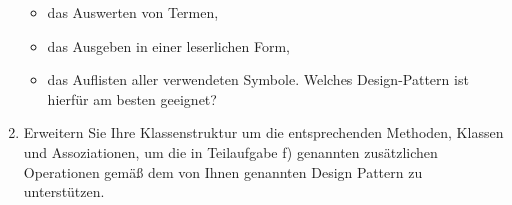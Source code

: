 \documentclass{lehramt-informatik-aufgabe}
\begin{document}
\begin{enumerate}
\begin{itemize}
\item das Auswerten von Termen,
\item das Ausgeben in einer leserlichen Form,
\item das Auflisten aller verwendeten Symbole.
Welches Design-Pattern ist hierfür am besten geeignet?

\end{itemize}

\item Erweitern Sie Ihre Klassenstruktur um die entsprechenden Methoden,
Klassen und Assoziationen, um die in Teilaufgabe f) genannten
zusätzlichen Operationen gemäß dem von Ihnen genannten Design Pattern zu
unterstützen.

\end{enumerate}
\end{document}

